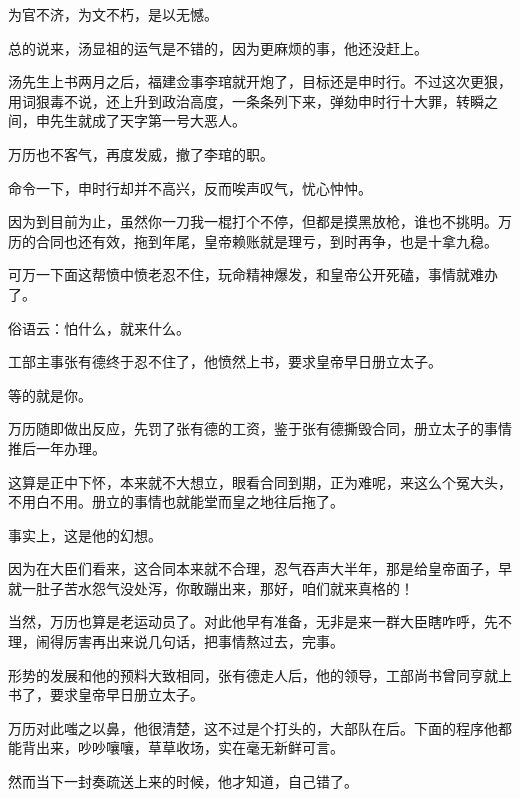 \begin{multicols}{\theparacolNo}
为官不济，为文不朽，是以无憾。
\begin{quote}
	\begin{spacing}{0.5}  %
		\textit{{\footnotesize
				\begin{description}
					\item[\textcolor{Gray}{\faQuoteRight}] 史赞：二百年来，一人而已。
				\end{description}
		}}
	\end{spacing}
\end{quote}

总的说来，汤显祖的运气是不错的，因为更麻烦的事，他还没赶上。

汤先生上书两月之后，福建佥事李琯就开炮了，目标还是申时行。不过这次更狠，用词狠毒不说，还上升到政治高度，一条条列下来，弹劾申时行十大罪，转瞬之间，申先生就成了天字第一号大恶人。

万历也不客气，再度发威，撤了李琯的职。

命令一下，申时行却并不高兴，反而唉声叹气，忧心忡忡。

因为到目前为止，虽然你一刀我一棍打个不停，但都是摸黑放枪，谁也不挑明。万历的合同也还有效，拖到年尾，皇帝赖账就是理亏，到时再争，也是十拿九稳。

可万一下面这帮愤中愤老忍不住，玩命精神爆发，和皇帝公开死磕，事情就难办了。

俗语云：怕什么，就来什么。

工部主事张有德终于忍不住了，他愤然上书，要求皇帝早日册立太子。

等的就是你。

万历随即做出反应，先罚了张有德的工资，鉴于张有德撕毁合同，册立太子的事情推后一年办理。

这算是正中下怀，本来就不大想立，眼看合同到期，正为难呢，来这么个冤大头，不用白不用。册立的事情也就能堂而皇之地往后拖了。

事实上，这是他的幻想。

因为在大臣们看来，这合同本来就不合理，忍气吞声大半年，那是给皇帝面子，早就一肚子苦水怨气没处泻，你敢蹦出来，那好，咱们就来真格的！

当然，万历也算是老运动员了。对此他早有准备，无非是来一群大臣瞎咋呼，先不理，闹得厉害再出来说几句话，把事情熬过去，完事。

形势的发展和他的预料大致相同，张有德走人后，他的领导，工部尚书曾同亨就上书了，要求皇帝早日册立太子。

万历对此嗤之以鼻，他很清楚，这不过是个打头的，大部队在后。下面的程序他都能背出来，吵吵嚷嚷，草草收场，实在毫无新鲜可言。

然而当下一封奏疏送上来的时候，他才知道，自己错了。


\end{multicols}
